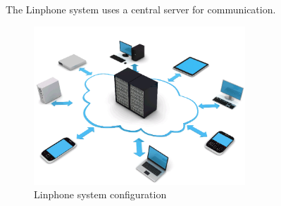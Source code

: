 \documentclass[11pt]{article}
\begin{document}
The Linphone system uses a central server for communication.

\begin{figure}[H]
\includegraphics[width=300px]{./images/network.png}
\caption{Linphone system configuration}
\label{Configuration}
\end{figure}


\newpage
\end{document}
